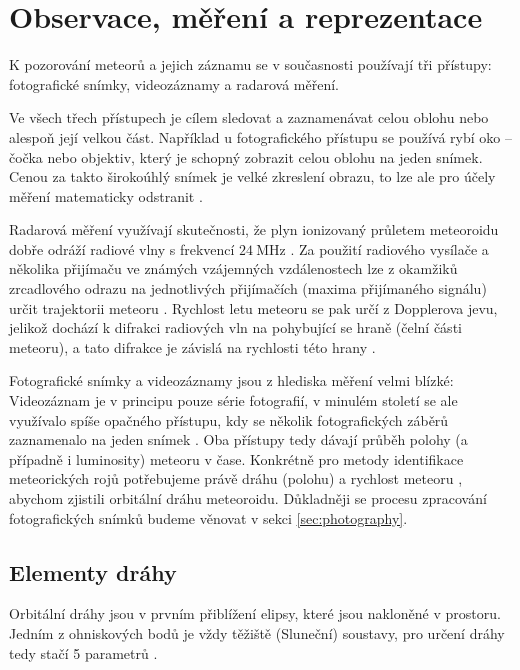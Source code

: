 \chapter{Observace, měření a reprezentace}
K pozorování meteorů a jejich záznamu se v současnosti používají tři přístupy: fotografické snímky, videozáznamy a radarová měření.

Ve všech třech přístupech je cílem sledovat a zaznamenávat celou oblohu nebo alespoň její velkou část. Například u fotografického přístupu se používá rybí oko \cite{ceplecha} -- čočka nebo objektiv, který je schopný zobrazit celou oblohu na jeden snímek. Cenou za takto širokoúhlý snímek je velké zkreslení obrazu, to lze ale pro účely měření matematicky odstranit \cite{ceplecha}.

\smallskip

Radarová měření využívají skutečnosti, že plyn ionizovaný průletem meteoroidu dobře odráží radiové vlny s frekvencí $24\:\text{MHz}$ \cite{radiosurvey}. Za použití radiového vysílače a několika přijímaču ve známých vzájemných vzdálenostech lze z okamžiků zrcadlového odrazu na jednotlivých přijímačích (maxima přijímaného signálu) určit trajektorii meteoru \cite{radiosurvey}. Rychlost letu meteoru se pak určí z Dopplerova jevu, jelikož dochází k difrakci radiových vln na pohybující se hraně (čelní části meteoru), a tato difrakce je závislá na rychlosti této hrany \cite{radiosurvey}.

\smallskip

Fotografické snímky a videozáznamy jsou z hlediska měření velmi blízké: Videozáznam je v principu pouze série fotografií, v minulém století se ale využívalo spíše opačného přístupu, kdy se několik fotografických záběrů zaznamenalo na jeden snímek \cite{ceplecha}. Oba přístupy tedy dávají průběh polohy (a případně i luminosity) meteoru v čase. Konkrétně pro metody identifikace meteorických rojů potřebujeme právě dráhu (polohu) a rychlost meteoru \cite{ceplecha}, abychom zjistili orbitální dráhu meteoroidu. Důkladněji se procesu zpracování fotografických snímků budeme věnovat v sekci \ref{sec:photography}.

\section{Elementy dráhy}\label{sec:orbit}
Orbitální dráhy jsou v prvním přiblížení elipsy, které jsou nakloněné v prostoru. Jedním z ohniskových bodů je vždy těžiště (Sluneční) soustavy, pro určení dráhy tedy stačí 5 parametrů \cite{astro}.

